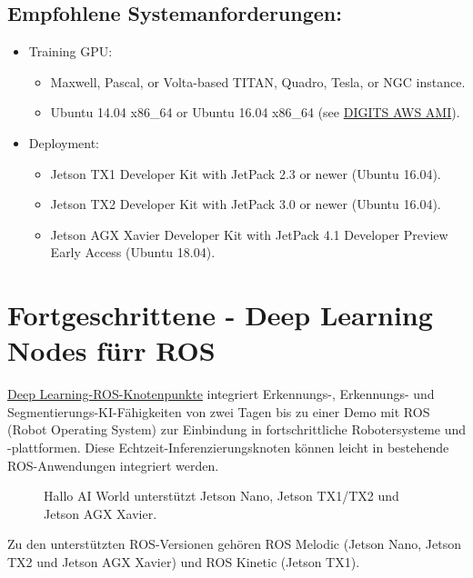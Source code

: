 {\subsection{Empfohlene Systemanforderungen:}

\begin{itemize}
  \item Training GPU:
    \begin{itemize}
      \item Maxwell, Pascal, or Volta-based TITAN, Quadro, Tesla, or NGC instance.
      \item Ubuntu 14.04 x86\_64 or Ubuntu 16.04 x86\_64 (see \href{https://aws.amazon.com/marketplace/pp/B01LZN28VD}{DIGITS AWS AMI}).
    \end{itemize}
  \item Deployment:
    \begin{itemize}
      \item Jetson TX1 Developer Kit with JetPack 2.3 or newer (Ubuntu 16.04).
      \item Jetson TX2 Developer Kit with JetPack 3.0 or newer (Ubuntu 16.04).
      \item Jetson AGX Xavier Developer Kit with JetPack 4.1 Developer Preview Early Access (Ubuntu 18.04).
    \end{itemize}
\end{itemize}


\section{Fortgeschrittene - Deep Learning Nodes fürr ROS}

\href{https://github.com/dusty-nv/ros_deep_learning}{Deep Learning-ROS-Knotenpunkte}
integriert Erkennungs-, Erkennungs- und Segmentierungs-KI-Fähigkeiten von zwei Tagen bis zu einer Demo mit ROS (Robot Operating System) zur Einbindung in fortschrittliche Robotersysteme und -plattformen. Diese Echtzeit-Inferenzierungsknoten können leicht in bestehende ROS-Anwendungen integriert werden.

\begin{figure}
	
	\caption{Hallo AI World unterstützt Jetson Nano, Jetson TX1/TX2 und Jetson AGX Xavier.}
	
\end{figure}



Zu den unterstützten ROS-Versionen gehören ROS Melodic (Jetson Nano, Jetson TX2 und Jetson AGX Xavier) und ROS Kinetic (Jetson TX1).



}
